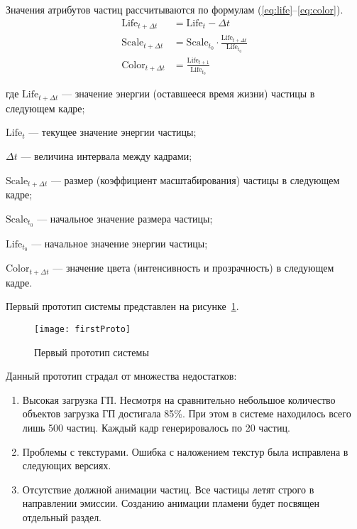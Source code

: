 Значения атрибутов частиц рассчитываются по формулам
(\ref{eq:life}--\ref{eq:color}).
\begin{align}
    \label{eq:life}
    \text{Life}_{t + \Delta{t}} &= \text{Life}_{t} - \Delta{t} \\
    \label{eq:scale}
    \text{Scale}_{t + \Delta{t}} &= \text{Scale}_{{t}_{0}} \cdot
    \frac{\text{Life}_{t + \Delta{t}}}{\text{Life}_{{t}_{0}}} \\
    \label{eq:color}
    \text{Color}_{t + \Delta{t}} &= \frac{\text{Life}_{t + 1}}{\text{Life}_{{t}_{0}}}
\end{align}
\begin{explanationx}
    \item [где] $\text{Life}_{t + \Delta{t}}$ --- значение энергии (оставшееся
        время жизни) частицы в следующем кадре;
    \item $\text{Life}_{t}$ --- текущее значение энергии частицы;
    \item $\Delta{t}$ --- величина интервала между кадрами;
    \item $\text{Scale}_{t + \Delta{t}}$ --- размер (коэффициент
        масштабирования) частицы  в следующем кадре;
    \item $\text{Scale}_{{t}_{0}}$ --- начальное значение размера частицы;
    \item $\text{Life}_{{t}_{0}}$ --- начальное значение энергии частицы;
    \item $\text{Color}_{t + \Delta{t}}$ --- значение цвета (интенсивность и
        прозрачность) в следующем кадре.
\end{explanationx}

Первый прототип системы представлен на рисунке~\ref{fig:firstProto}.
\begin{figure}[htb]
	\centering
    \texttt{[image: firstProto]}
    \caption{Первый прототип системы}%
    \label{fig:firstProto}
\end{figure}
Данный прототип страдал от множества недостатков:
\begin{enumerate}
    \item Высокая загрузка ГП. Несмотря на сравнительно небольшое количество
        объектов загрузка ГП достигала 85\%. При этом в системе находилось всего
        лишь 500 частиц. Каждый кадр генерировалось по 20 частиц.
    \item Проблемы с текстурами. Ошибка с наложением текстур была исправлена в
        следующих версиях.
    \item Отсутствие должной анимации частиц. Все частицы летят строго в
        направлении эмиссии. Созданию анимации пламени будет посвящен отдельный
        раздел.
\end{enumerate}

